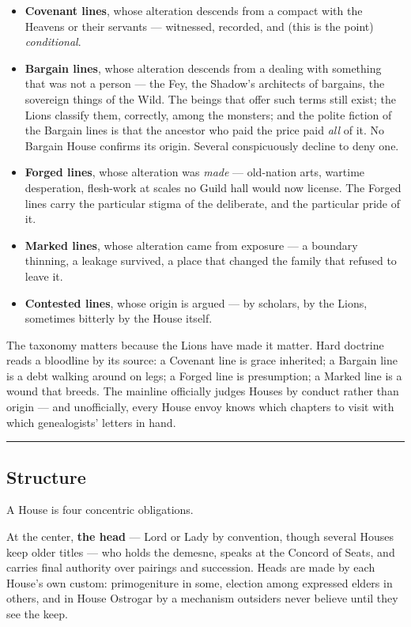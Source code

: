 \begin{itemize}
    \item \textbf{Covenant lines}, whose alteration descends from a compact with the Heavens or their servants --- witnessed, recorded, and (this is the point) \textit{conditional}.
    \item \textbf{Bargain lines}, whose alteration descends from a dealing with something that was not a person --- the Fey, the Shadow's architects of bargains, the sovereign things of the Wild. The beings that offer such terms still exist; the Lions classify them, correctly, among the monsters; and the polite fiction of the Bargain lines is that the ancestor who paid the price paid \textit{all} of it. No Bargain House confirms its origin. Several conspicuously decline to deny one.
    \item \textbf{Forged lines}, whose alteration was \textit{made} --- old-nation arts, wartime desperation, flesh-work at scales no Guild hall would now license. The Forged lines carry the particular stigma of the deliberate, and the particular pride of it.
    \item \textbf{Marked lines}, whose alteration came from exposure --- a boundary thinning, a leakage survived, a place that changed the family that refused to leave it.
    \item \textbf{Contested lines}, whose origin is argued --- by scholars, by the Lions, sometimes bitterly by the House itself.
\end{itemize}

The taxonomy matters because the Lions have made it matter. Hard doctrine reads a bloodline by its source: a Covenant line is grace inherited; a Bargain line is a debt walking around on legs; a Forged line is presumption; a Marked line is a wound that breeds. The mainline officially judges Houses by conduct rather than origin --- and unofficially, every House envoy knows which chapters to visit with which genealogists' letters in hand.

\medskip\hrule\medskip

\subsection{Structure}

A House is four concentric obligations.

At the center, \textbf{the head} --- Lord or Lady by convention, though several Houses keep older titles --- who holds the demesne, speaks at the Concord of Seats, and carries final authority over pairings and succession. Heads are made by each House's own custom: primogeniture in some, election among expressed elders in others, and in House Ostrogar by a mechanism outsiders never believe until they see the keep.

